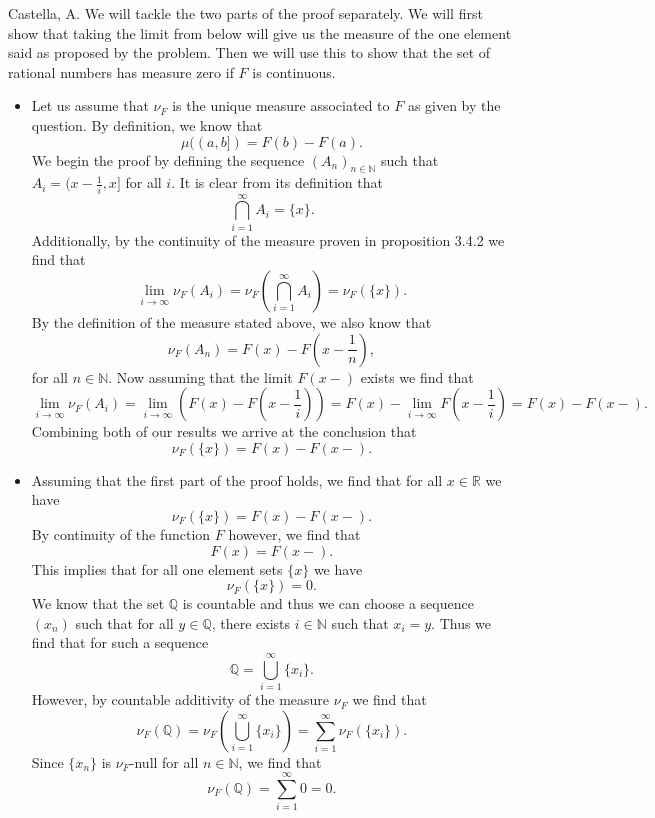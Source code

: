 \begin{solution}[3.18]{Castella, A.}
    We will tackle the two parts of the proof separately. We will first show that taking the limit from below will give us the measure of the one element said as proposed by the problem. Then we will use this to show that the set of rational numbers has measure zero if $F$ is continuous.
    \begin{itemize}
        \item Let us assume that $\nu_F$ is the unique measure associated to $F$ as given by the question. By definition, we know that
        $$
            \mu((a,b]) = F(b) - F(a).
        $$
        We begin the proof by defining the sequence $(A_n)_{n\in\mathbb{N}}$ such that $A_i = (x - \frac{1}{i},x]$ for all $i$. It is clear from its definition that
        $$
            \bigcap_{i=1}^\infty A_i = \{x\}.
        $$
        Additionally, by the continuity of the measure proven in proposition 3.4.2 we find that
        $$
            \lim_{i\rightarrow\infty}\nu_F(A_i) = \nu_{F}\left(\bigcap_{i=1}^\infty A_i\right) = \nu_F(\{x\}).
        $$
        By the definition of the measure stated above, we also know that
        $$
            \nu_F(A_n) = F(x) - F(x - \frac{1}{n}),
        $$
        for all $n \in \mathbb{N}$. Now assuming that the limit $F(x-)$ exists we find that
        $$
            \lim_{i\rightarrow\infty}\nu_F(A_i) = \lim_{i\rightarrow\infty}\left(F(x) - F(x-\frac{1}{i})\right) = F(x) - \lim_{i\rightarrow\infty}F(x-\frac{1}{i}) = F(x) - F(x-).
        $$
        Combining both of our results we arrive at the conclusion that
        $$
            \nu_F(\{x\}) = F(x) - F(x-).
        $$
        \item Assuming that the first part of the proof holds, we find that for all $x \in \mathbb{R}$ we have
        $$
            \nu_F(\{x\}) = F(x) - F(x-).
        $$
        By continuity of the function $F$ however, we find that
        $$
            F(x) = F(x-).
        $$
        This implies that for all one element sets $\{x\}$ we have
        $$
            \nu_F(\{x\}) = 0.
        $$
        We know that the set $\mathbb{Q}$ is countable and thus we can choose a sequence $(x_n)$ such that for all $y \in \mathbb{Q}$, there exists $i \in \mathbb{N}$ such that $x_i = y$. Thus we find that for such a sequence
        $$
            \mathbb{Q} = \bigcup_{i=1}^\infty \{x_i\}.
        $$
        However, by countable additivity of the measure $\nu_F$ we find that
        $$
            \nu_F(\mathbb{Q}) = \nu_F\left(\bigcup_{i=1}^\infty \{x_i\}\right) = \sum_{i=1}^\infty \nu_F(\{x_i\}).
        $$
        Since $\{x_n\}$ is $\nu_F$-null for all $n \in \mathbb{N}$, we find that
        $$
            \nu_F(\mathbb{Q}) = \sum_{i=1}^\infty 0 = 0.
        $$
    \end{itemize}
\end{solution}

